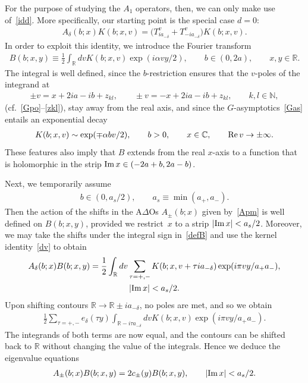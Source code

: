\documentclass[11pt]{article}
\numberwithin{equation}{section}
\newcommand{\De}{\Delta}
\newcommand{\de}{\delta}
\newcommand{\N}{{\mathbb N}}
\newcommand{\C}{{\mathbb C}}
\newcommand{\R}{{\mathbb R}}
\newcommand{\re}{{\rm Re}\, }
\newcommand{\im}{{\rm Im}\, }
\newcommand{\aaa}{a_{+},a_{-}}
\begin{document}
For the purpose of studying the $A_1$ operators, then, we can only make use of~\eqref{idd}. More specif\/ically, our starting point is the special case $d=0$:
\begin{gather}\label{dv}
A_{\de}(b;x)K(b;x,v)= \big(T^v_{ia_{-\de}} +T^v_{-ia_{-\de}} \big)K(b;x,v).
\end{gather}
In order to exploit this identity, we introduce  the Fourier transform
\begin{gather}\label{defB}
B(b;x,y)\equiv \frac{1}{2}\int_{\R}dvK(b;x,v)\exp(i\alpha vy/2),\qquad b\in(0,2a),\qquad x,y\in \R.
\end{gather}
The integral is well def\/ined, since the $b$-restriction ensures that the $v$-poles of the integrand at
\begin{gather}\label{Kpo}
\pm v=x+2ia-ib+z_{kl}, \qquad \pm v=-x+2ia-ib+z_{kl},\qquad k,l\in\N,
\end{gather}
(cf.~\eqref{Gpo}--\eqref{zkl}), stay away from the real axis, and since the $G$-asymptotics~\eqref{Gas} entails an exponential decay
\begin{gather}
K(b;x,v)\sim \exp(\mp \alpha bv/2),\qquad b>0,\qquad x\in\C,\qquad \re v\to\pm\infty.
\end{gather}
These features also imply that $B$ extends from the real $x$-axis to a function that is holomorphic in the strip $\im x\in (-2a+b,2a-b)$.

Next, we temporarily  assume
\begin{gather}
b\in(0,a_s/2),\qquad a_s\equiv\min(\aaa).
\end{gather}
Then the action of the shifts in the A$\De$Os $A_{\pm}(b;x)$ given by~\eqref{Apm} is well def\/ined on $B(b;x,y)$, provided we restrict~$x$ to a strip $|\im x|<a_s/2$. Moreover, we may take the shifts under the integral sign in~\eqref{defB} and use the kernel identity~\eqref{dv} to obtain
\begin{gather}
A_{\de}(b;x)B(b;x,y)=\frac{1}{2}\int_{\R}dv\sum_{\tau=+,-}K(b;x,v+\tau ia_{-\de})\exp(i\pi vy/a_+a_-),\\
 |\im x|<a_s/2.\nonumber
\end{gather}
Upon shifting contours $\R\to \R\pm ia_{-\de}$, no poles are met, and so we obtain
\begin{gather}
\frac12\sum_{\tau=+,-}e_{\de}(\tau y)\int_{\R-i\tau a_{-\de}}dvK(b;x,v)\exp(i\pi vy/a_+a_-).
\end{gather}
The integrands of both terms are now equal, and the contours can be shifted back to $\R$ without changing the value of the integrals. Hence we deduce the eigenvalue equations
\begin{gather}\label{eigen}
A_{\pm}(b;x)B(b;x,y)=2c_{\pm}(y)B(b;x,y),\qquad |\im x|<a_s/2.
\end{gather}
\end{document}
